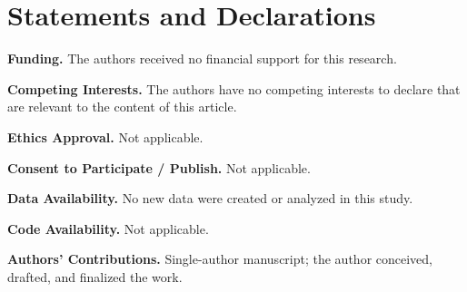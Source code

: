 \documentclass[11pt]{article}
\begin{document}
\section*{Statements and Declarations}
\textbf{Funding.} The authors received no financial support for this research.

\textbf{Competing Interests.} The authors have no competing interests to declare that are relevant to the content of this article.

\textbf{Ethics Approval.} Not applicable.

\textbf{Consent to Participate / Publish.} Not applicable.

\textbf{Data Availability.} No new data were created or analyzed in this study.

\textbf{Code Availability.} Not applicable.

\textbf{Authors’ Contributions.} Single-author manuscript; the author conceived, drafted, and finalized the work.
\end{document}
